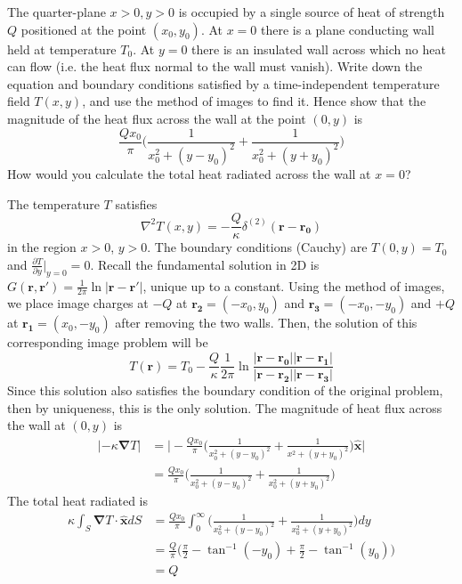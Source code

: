 \documentclass[a4paper]{article}
\begin{document}
\newpage
\begin{qns}[Images]
The quarter-plane $x>0,y>0$ is occupied by a single source of heat of strength $Q$ positioned at the point $(x_0,y_0)$. At $x = 0$ there is a plane conducting wall held at temperature $T_0$. At $y = 0$ there is an insulated wall across which no heat can flow (i.e. the heat flux normal to the wall must vanish). Write down the equation and boundary conditions satisfied by a time-independent temperature field $T(x,y)$, and use the method of images to find it. Hence show that the magnitude of the heat flux across the wall at the point $(0,y)$ is
$$\frac{Qx_0}{\pi}\bigg(\frac{1}{x_0^2+(y-y_0)^2}+\frac{1}{x_0^2+(y+y_0)^2}\bigg)$$
How would you calculate the total heat radiated across the wall at $x = 0$?
\end{qns}
\begin{ans}
The temperature $T$ satisfies 
$$\nabla^2T(x,y)=-\frac{Q}{\kappa}\delta^{(2)}(\mathbf{r}-\mathbf{r_0})$$
in the region $x>0$, $y>0$. The boundary conditions (Cauchy) are $T(0,y)=T_0$ and $\frac{\partial T}{\partial y}|_{y=0}=0$. Recall the fundamental solution in 2D is $G(\mathbf{r},\mathbf{r'})=\frac{1}{2\pi}\ln|\mathbf{r}-\mathbf{r'}|$, unique up to a constant. Using the method of images, we place image charges at $-Q$ at $\mathbf{r_2}=(-x_0,y_0)$ and $\mathbf{r_3}=(-x_0,-y_0)$ and $+Q$ at $\mathbf{r_1}=(x_0,-y_0)$ after removing the two walls. Then, the solution of this corresponding image problem will be
$$T(\mathbf{r})=T_0-\frac{Q}{\kappa}\frac{1}{2\pi}\ln\frac{|\mathbf{r}-\mathbf{r_0}||\mathbf{r}-\mathbf{r_1}|}{|\mathbf{r}-\mathbf{r_2}||\mathbf{r}-\mathbf{r_3}|}$$
Since this solution also satisfies the boundary condition of the original problem, then by uniqueness, this is the only solution. The magnitude of heat flux across the wall at $(0,y)$ is
\begin{align}
|-\kappa\boldsymbol{\nabla}T|&=\bigg|-\frac{Qx_0}{\pi}\bigg(\frac{1}{x_0^2+(y-y_0)^2}+\frac{1}{x^2+(y+y_0)^2}\bigg)\mathbf{\hat{x}}\bigg|\nonumber\\&=\frac{Qx_0}{\pi}\bigg(\frac{1}{x_0^2+(y-y_0)^2}+\frac{1}{x_0^2+(y+y_0)^2}\bigg)\nonumber
\end{align}
The total heat radiated is
\begin{align}
\kappa\int_S\boldsymbol{\nabla}T\cdot\mathbf{\hat{x}}dS&=\frac{Qx_0}{\pi}\int_0^\infty\bigg(\frac{1}{x_0^2+(y-y_0)^2}+\frac{1}{x_0^2+(y+y_0)^2}\bigg)dy\nonumber\\&=\frac{Q}{\pi}\bigg(\frac{\pi}{2}-\tan^{-1}(-y_0)+\frac{\pi}{2}-\tan^{-1}(y_0)\bigg)\nonumber\\&=Q\nonumber
\end{align}
\end{ans}
\end{document}

